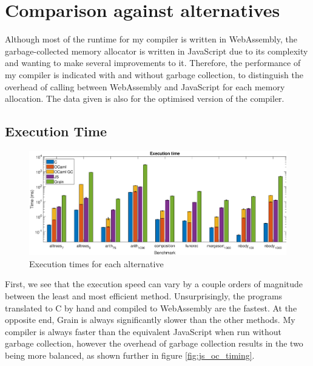 

\section{Comparison against alternatives}
Although most of the runtime for my compiler is written in WebAssembly, the garbage-collected memory allocator is written in JavaScript due to its complexity and wanting to make several improvements to it. Therefore, the performance of my compiler is indicated with and without garbage collection, to distinguish the overhead of calling between WebAssembly and JavaScript for each memory allocation. The data given is also for the optimised version of the compiler.

\subsection{Execution Time}

\begin{figure}[H]
\hspace{-0.7cm}
\includegraphics[scale=0.42]{figures/alternatives_timing}
\vspace{-0.5cm}
\caption{Execution times for each alternative}
 \label{fig:alt_timing} 
\end{figure}

First, we see that the execution speed can vary by a couple orders of magnitude between the least and most efficient method. Unsurprisingly, the programs translated to C by hand and compiled to WebAssembly are the fastest. At the opposite end, Grain is always significantly slower than the other methods. My compiler is always faster than the equivalent JavaScript when run without garbage collection, however the overhead of garbage collection results in the two being more balanced, as shown further in figure \ref{fig:js_oc_timing}.%


